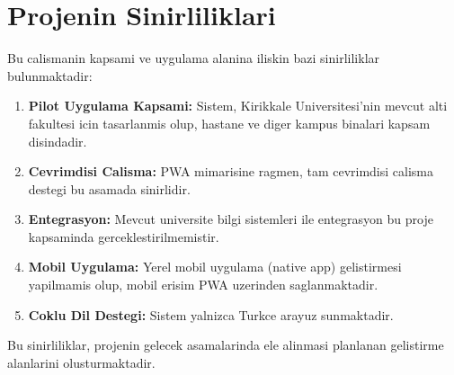 \section{Projenin Sinirliliklari}
\label{sec:sinirliliklar}

Bu calismanin kapsami ve uygulama alanina iliskin bazi 
sinirliliklar bulunmaktadir:

\begin{enumerate}
    \item \textbf{Pilot Uygulama Kapsami:} Sistem, Kirikkale 
    Universitesi'nin mevcut alti fakultesi icin tasarlanmis 
    olup, hastane ve diger kampus binalari kapsam disindadir.
    
    \item \textbf{Cevrimdisi Calisma:} PWA mimarisine ragmen, 
    tam cevrimdisi calisma destegi bu asamada sinirlidir.
    
    \item \textbf{Entegrasyon:} Mevcut universite bilgi sistemleri 
    ile entegrasyon bu proje kapsaminda gerceklestirilmemistir.
    
    \item \textbf{Mobil Uygulama:} Yerel mobil uygulama (native app) 
    gelistirmesi yapilmamis olup, mobil erisim PWA uzerinden 
    saglanmaktadir.
    
    \item \textbf{Coklu Dil Destegi:} Sistem yalnizca Turkce 
    arayuz sunmaktadir.
\end{enumerate}

Bu sinirliliklar, projenin gelecek asamalarinda ele alinmasi 
planlanan gelistirme alanlarini olusturmaktadir.
